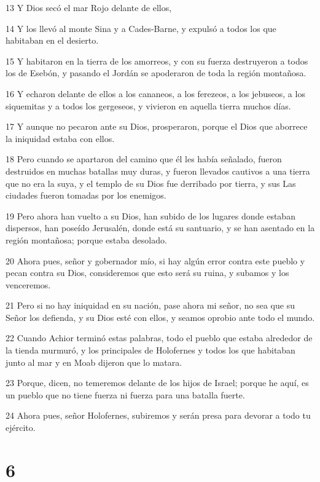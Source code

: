 \par 13 Y Dios secó el mar Rojo delante de ellos,
\par 14 Y los llevó al monte Sina y a Cades-Barne, y expulsó a todos los que habitaban en el desierto.
\par 15 Y habitaron en la tierra de los amorreos, y con su fuerza destruyeron a todos los de Esebón, y pasando el Jordán se apoderaron de toda la región montañosa.
\par 16 Y echaron delante de ellos a los cananeos, a los ferezeos, a los jebuseos, a los siquemitas y a todos los gergeseos, y vivieron en aquella tierra muchos días.
\par 17 Y aunque no pecaron ante su Dios, prosperaron, porque el Dios que aborrece la iniquidad estaba con ellos.
\par 18 Pero cuando se apartaron del camino que él les había señalado, fueron destruidos en muchas batallas muy duras, y fueron llevados cautivos a una tierra que no era la suya, y el templo de su Dios fue derribado por tierra, y sus Las ciudades fueron tomadas por los enemigos.
\par 19 Pero ahora han vuelto a su Dios, han subido de los lugares donde estaban dispersos, han poseído Jerusalén, donde está su santuario, y se han asentado en la región montañosa; porque estaba desolado.
\par 20 Ahora pues, señor y gobernador mío, si hay algún error contra este pueblo y pecan contra su Dios, consideremos que esto será su ruina, y subamos y los venceremos.
\par 21 Pero si no hay iniquidad en su nación, pase ahora mi señor, no sea que su Señor los defienda, y su Dios esté con ellos, y seamos oprobio ante todo el mundo.
\par 22 Cuando Achior terminó estas palabras, todo el pueblo que estaba alrededor de la tienda murmuró, y los principales de Holofernes y todos los que habitaban junto al mar y en Moab dijeron que lo matara.
\par 23 Porque, dicen, no temeremos delante de los hijos de Israel; porque he aquí, es un pueblo que no tiene fuerza ni fuerza para una batalla fuerte.
\par 24 Ahora pues, señor Holofernes, subiremos y serán presa para devorar a todo tu ejército.

\chapter{6}

